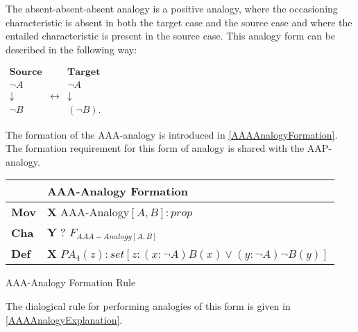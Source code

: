 				The absent-absent-absent analogy is a positive analogy, where the occasioning characteristic is absent in both the target case and the source case and where the entailed characteristic is present in the source case. This analogy form can be described in the following way:
                	\begin{table}[H]
                	\centering	
                	$
                    \begin{array}{ccc}
                    	\textbf{Source} &                 & \textbf{Target} \\
                    	\neg A          &  & \neg A          \\
                    	\downarrow      & \leftrightarrow & \downarrow      \\
                    	\neg B          &  & (\neg B).
                    \end{array}
               	 	$
               	 	\end{table}
               	 The formation of the AAA-analogy is introduced in \autoref{AAAAnalogyFormation}. The formation requirement for this form of analogy is shared with the AAP-analogy. 
               	 	
               		\begin{Scheme}[H]\footnotesize
               		\centering
               		\begin{tabular}{l l}
               			                   & \textbf{AAA-Analogy Formation} \\ \toprule
               			\textbf{Mov}      & \textbf{X} AAA-Analogy$[A,B] : prop$ \\ \midrule
               			\textbf{Cha} & \textbf{Y} ? $F_{AAA-Analogy[A,B]}$ \\ \midrule
               			\textbf{Def}   & \textbf{X} $PA_4(z) : set [z : (x : \neg A) B(x) \lor (y : \neg A) \neg B(y)]$ \\ \bottomrule
               		\end{tabular}
               		\caption{AAA-Analogy Formation Rule}
               		\label{AAAAnalogyFormation}
					\end{Scheme}	
               	 	
               	 \noindent The dialogical rule for performing analogies of this form is given in \autoref{AAAAnalogyExplanation}.
					
